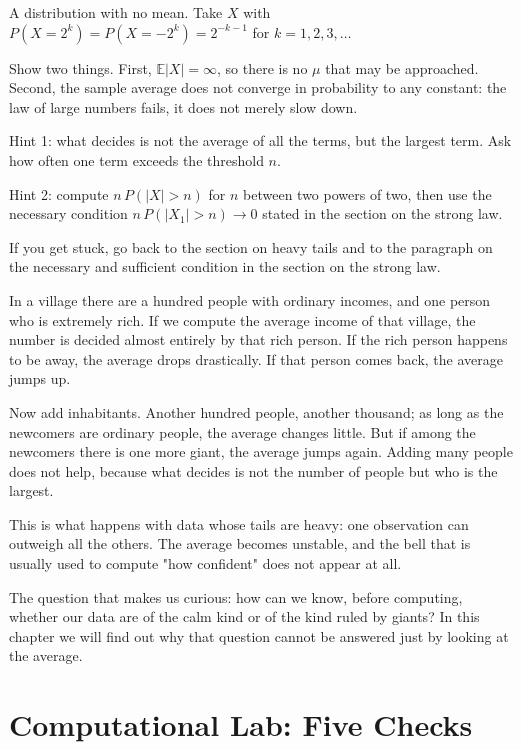 \begin{tantangan}
A distribution with no mean. Take $X$ with
$P(X=2^k)=P(X=-2^k)=2^{-k-1}$ for $k=1,2,3,\dots$

Show two things. First, $\mathbb{E}|X|=\infty$, so there is no $\mu$ that may be
approached. Second, the sample average does not converge in probability to any
constant: the law of large numbers fails, it does not merely slow down.

Hint 1: what decides is not the average of all the terms, but the largest term. Ask
how often one term exceeds the threshold $n$.

Hint 2: compute $n\,P(|X|>n)$ for $n$ between two powers of two, then use the
necessary condition $n\,P(|X_1|>n)\to0$ stated in the section on the strong law.

If you get stuck, go back to the section on heavy tails and to the paragraph on the
necessary and sufficient condition in the section on the strong law.
\end{tantangan}

\begin{untukanak}
In a village there are a hundred people with ordinary incomes, and one person who is
extremely rich. If we compute the average income of that village, the number is
decided almost entirely by that rich person. If the rich person happens to be away,
the average drops drastically. If that person comes back, the average jumps up.

Now add inhabitants. Another hundred people, another thousand; as long as the
newcomers are ordinary people, the average changes little. But if among the newcomers
there is one more giant, the average jumps again. Adding many people does not help,
because what decides is not the number of people but who is the largest.

This is what happens with data whose tails are heavy: one observation can outweigh
all the others. The average becomes unstable, and the bell that is usually used to
compute "how confident" does not appear at all.

The question that makes us curious: how can we know, before computing, whether our
data are of the calm kind or of the kind ruled by giants? In this chapter we will
find out why that question cannot be answered just by looking at the average.
\end{untukanak}

\section{Computational Lab: Five Checks}

